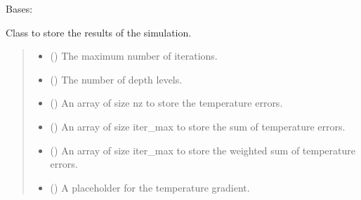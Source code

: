 \documentclass[a4paper,11pt,english,openany]{sphinxmanual}
\begin{document}
\begin{fulllineitems}
\label{\detokenize{api/spyice.parameters.results_params:spyice.parameters.results_params.ResultsParams}}
\pysigstartsignatures
{}
\pysigstopsignatures
\sphinxAtStartPar
Bases: 

\sphinxAtStartPar
Class to store the results of the simulation.
\begin{quote}\begin{description}
\begin{itemize}
\item {} 
\sphinxAtStartPar
{} () \textendash{} The maximum number of iterations.

\item {} 
\sphinxAtStartPar
{} () \textendash{} The number of depth levels.

\end{itemize}

\begin{itemize}
\item {} 
\sphinxAtStartPar
{} () \textendash{} An array of size nz to store the temperature errors.

\item {} 
\sphinxAtStartPar
{} () \textendash{} An array of size iter\_max to store the sum of temperature errors.

\item {} 
\sphinxAtStartPar
{} () \textendash{} An array of size iter\_max to store the weighted sum of temperature errors.

\item {} 
\sphinxAtStartPar
{} () \textendash{} A placeholder for the temperature gradient.


\end{itemize}
\end{description}
\end{quote}
\end{fulllineitems}
\end{document}
